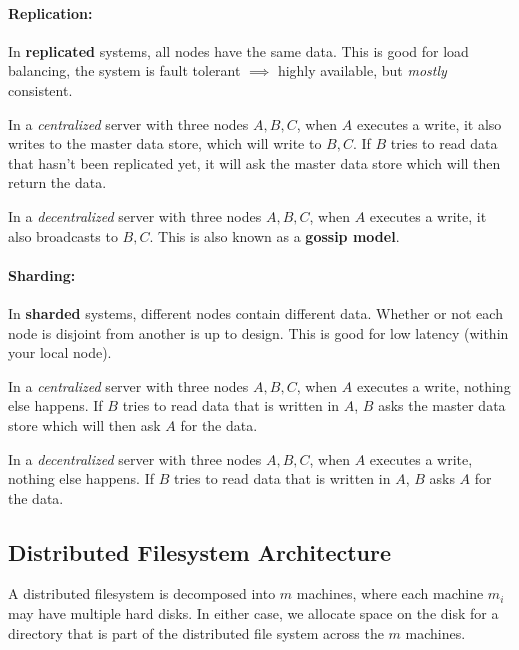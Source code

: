 \documentclass{report}
\newenvironment{example}{\begin{tcolorbox}[title={Example},colback=green!5!white,colframe=black!75!green]}{\end{tcolorbox}}
\renewcommand{\bf}[1]{\textbf{{#1}}}
\renewcommand{\it}[1]{\textit{{#1}}}
\begin{document}
\paragraph{Replication:} In \bf{replicated} systems, all nodes have the same
data. This is good for load balancing, the system is fault tolerant $\implies$
highly available, but \it{mostly} consistent.
\begin{example}
    In a \it{centralized} server with three nodes $A, B, C$, when $A$ executes
    a write, it also writes to the master data store, which will write to
    $B, C$. If $B$ tries to read data that hasn't been replicated yet, it will
    ask the master data store which will then return the data.
    \vspace{0.5em}

    In a \it{decentralized} server with three nodes $A, B, C$, when $A$
    executes a write, it also broadcasts to $B, C$. This is also known as a
    \bf{gossip model}.
\end{example}

\paragraph{Sharding:} In \bf{sharded} systems, different nodes contain
different data. Whether or not each node is disjoint from another is up to
design. This is good for low latency (within your local node).
\begin{example}
    In a \it{centralized} server with three nodes $A, B, C$, when $A$ executes
    a write, nothing else happens. If $B$ tries to read data that is written in
    $A$, $B$ asks the master data store which will then ask $A$ for the data.
    \vspace{0.5em}

    In a \it{decentralized} server with three nodes $A, B, C$, when $A$
    executes a write, nothing else happens. If $B$ tries to read data that is
    written in $A$, $B$ asks $A$ for the data.
\end{example}

\subsection{Distributed Filesystem Architecture}
A distributed filesystem is decomposed into $m$ machines, where each machine
$m_i$ may have multiple hard disks. In either case, we allocate space on the
disk for a directory that is part of the distributed file system across the $m$
machines.
\end{document}
